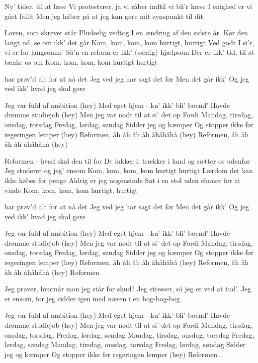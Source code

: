\documentclass[a4paper,11pt]{article}
\begin{document}
\begin{song}
Ny' tider, til at læse
Vi protesterer, ja vi råber indtil vi bli'r hæse
I enighed er vi gået fallit
Men jeg håber på at jeg kan gøre mit synspunkt til dit

Loven, som skrevet står
Pludselig vedtog I en ændring af den sidste år.
Kør den langt ud, se om ikk' det går
 Kom, kom, kom, kom hurtigt, hurtigt
Ved godt I si'r, vi er for langsomm'
Så'n en reform er ikk' (særlig) hjælpsom
Der er ikk' tid, til at tænke os om
Kom, kom, kom, kom hurtigt hurtigt

har prøv'd alt for at nå det
Jeg ved jeg har sagt det før
Men det går ikk'
Og jeg ved ikk' hvad jeg skal gøre

Jeg var fuld af ambition (hey)
Med eget hjem - ku' ikk' bli' boend'
Havde drømme studiejob (hey)
Men jeg var nødt til at si' det op
Fordi 
Mandag, tirsdag, onsdag, torsdag
Fredag, lørdag, søndag
Sidder jeg og kæmper
Og stopper ikke før regeringen lemper (hey)
Reformen, åh åh åh åh åhåhåhå (hey)
Reformen, åh åh åh åh åhåhåhå (hey)

Reformen - hvad skal den til for
De lukker i, trækker i land og sætter os udenfor
Jeg studerer og jeg' ensom
Kom, kom, kom, kom hurtigt hurtigt
Lærdom det kan ikke købes for penge
Aldrig er jeg nogensinde
Sat i en stol uden chance for at vinde
Kom, kom, kom, kom hurtigt, hurtigt

har prøv'd alt for at nå det
Jeg ved jeg har sagt det før
Men det går ikk'
Og jeg ved ikk' hvad jeg skal gøre

Jeg var fuld af ambition (hey)
Med eget hjem - ku' ikk' bli' boend'
Havde drømme studiejob (hey)
Men jeg var nødt til at si' det op
Fordi 
Mandag, tirsdag, onsdag, torsdag
Fredag, lørdag, søndag
Sidder jeg og kæmper
Og stopper ikke før regeringen lemper (hey)
Reformen, åh åh åh åh åhåhåhå (hey)
Reformen, åh åh åh åh åhåhåhå (hey)
Reformen

Jeg prøver, hvornår mon jeg står for skud?
Jeg stresser, så jeg er ved at tud'.
Jeg er ensom, for jeg sidder igen med næsen i en bog-bog-bog

Jeg var fuld af ambition (hey)
Med eget hjem - ku' ikk' bli' boend'
Havde drømme studiejob (hey)
Men jeg var nødt til at si' det op
Fordi 
Mandag, tirsdag, onsdag, torsdag,
Fredag, lørdag, søndag
Mandag, tirsdag, onsdag, torsdag
Fredag, lørdag, søndag
Mandag, tirsdag, onsdag, torsdag
Fredag, lørdag, søndag
Sidder jeg og kæmper
Og stopper ikke før regeringen lemper (hey)
Reformen...
\end{song}
\end{document}
